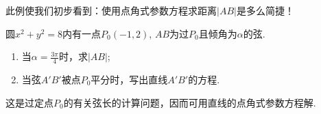 \begin{remark}
    此例使我们初步看到：使用点角式参数方程求距离$|AB|$是多么简捷！
\end{remark}



\begin{example}
圆$x^2+y^2=8$内有一点$P_0(-1,2)$, $AB$为过$P_0$且倾角为$\alpha$的弦.
\begin{enumerate}[(1)]
\item 当$\alpha=\frac{3\pi}{4}$时，求$|AB|$;
\item 当弦$A'B'$被点$P_0$平分时，写出直线$A'B'$的方程.   
\end{enumerate}
\end{example} 

\begin{analyze}
    这是过定点$P_0$的有关弦长的计算问题，因而可用直线的点角式参数方程解.
\end{analyze}

